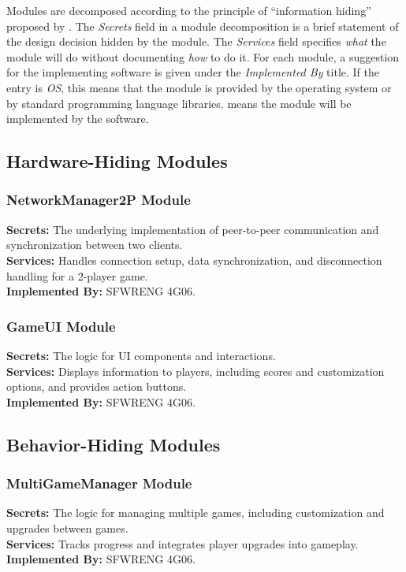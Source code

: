 \documentclass[12pt, titlepage]{article}
\begin{document}
Modules are decomposed according to the principle of ``information hiding''
proposed by \citet{ParnasEtAl1984}. The \emph{Secrets} field in a module
decomposition is a brief statement of the design decision hidden by the
module. The \emph{Services} field specifies \emph{what} the module will do
without documenting \emph{how} to do it. For each module, a suggestion for the
implementing software is given under the \emph{Implemented By} title. If the
entry is \emph{OS}, this means that the module is provided by the operating
system or by standard programming language libraries.  \emph{\progname{}} means the
module will be implemented by the \progname{} software.

\subsection{Hardware-Hiding Modules}
\subsubsection{NetworkManager2P Module}
\textbf{Secrets:} The underlying implementation of peer-to-peer communication and synchronization between two clients.\\
\textbf{Services:} Handles connection setup, data synchronization, and disconnection handling for a 2-player game.\\
\textbf{Implemented By:} SFWRENG 4G06.

\subsubsection{GameUI Module}
\textbf{Secrets:} The logic for UI components and interactions.\\
\textbf{Services:} Displays information to players, including scores and customization options, and provides action buttons.\\
\textbf{Implemented By:} SFWRENG 4G06.

\subsection{Behavior-Hiding Modules}
\subsubsection{MultiGameManager Module}
\textbf{Secrets:} The logic for managing multiple games, including customization and upgrades between games.\\
\textbf{Services:} Tracks progress and integrates player upgrades into gameplay.\\
\textbf{Implemented By:} SFWRENG 4G06.
\end{document}
